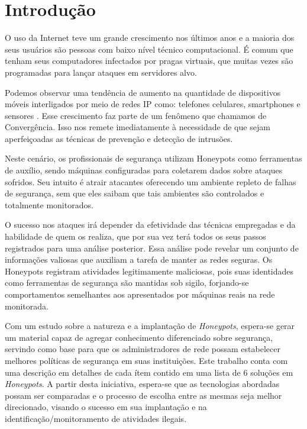 \chapter*{Introdução}

O uso da Internet teve um grande crescimento nos últimos anos \cite{InternetGrowth} e a maioria dos seus usuários são pessoas com baixo nível técnico computacional. É comum que tenham seus computadores infectados por pragas virtuais, que muitas vezes são programadas para lançar ataques em servidores alvo.

Podemos observar uma tendência de aumento na quantidade de dispositivos móveis interligados por meio de redes IP como: telefones celulares, smartphones e sensores \cite{WirelessSensors}. Esse crescimento faz parte de um fenômeno que chamamos de Convergência. Isso nos remete imediatamente à necessidade de que sejam aperfeiçoadas as técnicas de prevenção e detecção de intrusões.

Neste cenário, os profissionais de segurança utilizam Honeypots \cite{UsingHoneypots} como ferramentas de auxílio, sendo máquinas configuradas para coletarem dados sobre ataques sofridos. Seu intuito é atrair atacantes oferecendo um ambiente repleto de falhas de segurança, sem que eles saibam que tais ambientes são controlados e totalmente monitorados.

O sucesso nos ataques irá depender da efetividade das técnicas empregadas e da habilidade de quem os realiza, que por sua vez terá todos os seus passos registrados para uma análise posterior. Essa análise pode revelar um conjunto de informações valiosas que auxiliam a tarefa de manter as redes seguras. Os Honeypots registram atividades legitimamente maliciosas, pois suas identidades como ferramentas de segurança são mantidas sob sigilo, forjando-se comportamentos semelhantes aos apresentados por máquinas reais na rede monitorada.

Com um estudo sobre a natureza e a implantação de \textit{Honeypots}, espera-se gerar um material capaz de agregar conhecimento diferenciado sobre segurança, servindo como base para que os administradores de rede possam estabelecer melhores políticas de segurança em suas instituições. Este trabalho conta com uma descrição em detalhes de cada ítem contido em uma lista de 6 soluções em \textit{Honeypots}. A partir desta iniciativa, espera-se que as tecnologias abordadas possam ser comparadas e o processo de escolha entre as mesmas seja melhor direcionado, visando o sucesso em sua implantação e na identificação/monitoramento de atividades ilegais.

